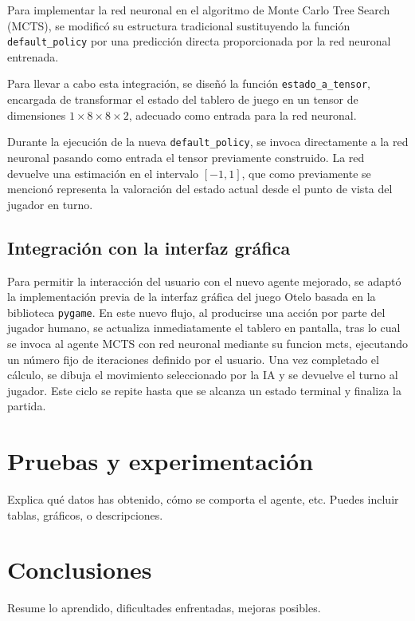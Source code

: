 \documentclass[conference]{IEEEtran}
\begin{document}
Para implementar la red neuronal en el algoritmo de Monte Carlo Tree Search (MCTS), se modificó su estructura tradicional sustituyendo la función \texttt{default\_policy} por una predicción directa proporcionada por la red neuronal entrenada. 

Para llevar a cabo esta integración, se diseñó la función \texttt{estado\_a\_tensor}, encargada de transformar el estado del tablero de juego en un tensor de dimensiones $1 \times 8 \times 8 \times 2$, adecuado como entrada para la red neuronal. 

Durante la ejecución de la nueva \texttt{default\_policy}, se invoca directamente a la red neuronal pasando como entrada el tensor previamente construido. La red devuelve una estimación en el intervalo $[-1, 1]$, que como previamente se mencionó representa la valoración del estado actual desde el punto de vista del jugador en turno. 

\subsection{Integración con la interfaz gráfica}

Para permitir la interacción del usuario con el nuevo agente mejorado, se adaptó la implementación previa de la interfaz gráfica del juego Otelo basada en la biblioteca \texttt{pygame}. En este nuevo flujo, al producirse una acción por parte del jugador humano, se actualiza inmediatamente el tablero en pantalla, tras lo cual se invoca al agente MCTS con red neuronal mediante su funcion mcts, ejecutando un número fijo de iteraciones definido por el usuario. Una vez completado el cálculo, se dibuja el movimiento seleccionado por la IA y se devuelve el turno al jugador. Este ciclo se repite hasta que se alcanza un estado terminal y finaliza la partida.

\section{Pruebas y experimentación}
Explica qué datos has obtenido, cómo se comporta el agente, etc. Puedes incluir tablas, gráficos, o descripciones.

\section{Conclusiones}
Resume lo aprendido, dificultades enfrentadas, mejoras posibles.




\end{document}
